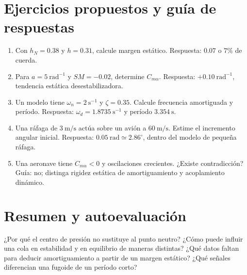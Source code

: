 \section{Ejercicios propuestos y guía de respuestas}
\begin{enumerate}
\item Con $h_N=0.38$ y $h=0.31$, calcule margen estático. Respuesta: $0.07$ o $7\%$ de cuerda.
\item Para $a=5\ \mathrm{rad^{-1}}$ y $SM=-0.02$, determine $C_{m\alpha}$. Respuesta: $+0.10\ \mathrm{rad^{-1}}$, tendencia estática desestabilizadora.
\item Un modelo tiene $\omega_n=2\ \mathrm{s^{-1}}$ y $\zeta=0.35$. Calcule frecuencia amortiguada y período. Respuesta: $\omega_d=1.8735\ \mathrm{s^{-1}}$ y período $3.354\ \mathrm s$.
\item Una ráfaga de $3\ \mathrm{m/s}$ actúa sobre un avión a $60\ \mathrm{m/s}$. Estime el incremento angular inicial. Respuesta: $0.05\ \mathrm{rad}\simeq2.86^\circ$, dentro del modelo de pequeña ráfaga.
\item Una aeronave tiene $C_{m\alpha}<0$ y oscilaciones crecientes. ¿Existe contradicción? Guía: no; distinga rigidez estática de amortiguamiento y acoplamiento dinámico.
\end{enumerate}
\section{Resumen y autoevaluación}
¿Por qué el centro de presión no sustituye al punto neutro? ¿Cómo puede influir una cola en estabilidad y en equilibrio de maneras distintas? ¿Qué datos faltan para deducir amortiguamiento a partir de un margen estático? ¿Qué señales diferencian una fugoide de un período corto?


\studiumchaptercheck
